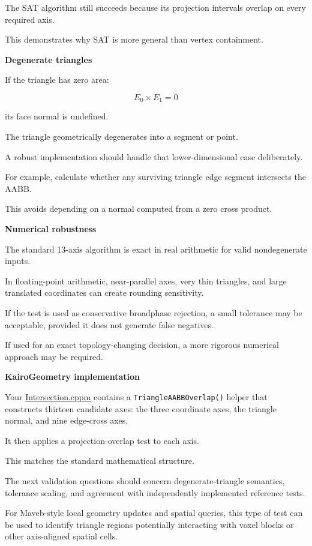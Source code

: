 The SAT algorithm still succeeds because its projection intervals overlap on every required axis.

This demonstrates why SAT is more general than vertex containment.

\textbf{Degenerate triangles}

If the triangle has zero area:

\[
E_0\times E_1=0
\]

its face normal is undefined.

The triangle geometrically degenerates into a segment or point.

A robust implementation should handle that lower-dimensional case deliberately.

For example, calculate whether any surviving triangle edge segment intersects the AABB.

This avoids depending on a normal computed from a zero cross product.

\textbf{Numerical robustness}

The standard 13-axis algorithm is exact in real arithmetic for valid nondegenerate inputs.

In floating-point arithmetic, near-parallel axes, very thin triangles, and large translated coordinates can create rounding sensitivity.

If the test is used as conservative broadphase rejection, a small tolerance may be acceptable, provided it does not generate false negatives.

If used for an exact topology-changing decision, a more rigorous numerical approach may be required.

\textbf{KairoGeometry implementation}

Your \href{https://github.com/swayam8624/KairoGeometry/blob/master/Intersection.cppm?utm_source=chatgpt.com}{Intersection.cppm} contains a \texttt{TriangleAABBOverlap()} helper that constructs thirteen candidate axes: the three coordinate axes, the triangle normal, and nine edge-cross axes.

It then applies a projection-overlap test to each axis.

This matches the standard mathematical structure.

The next validation questions should concern degenerate-triangle semantics, tolerance scaling, and agreement with independently implemented reference tests.

For Maveb-style local geometry updates and spatial queries, this type of test can be used to identify triangle regions potentially interacting with voxel blocks or other axis-aligned spatial cells.


